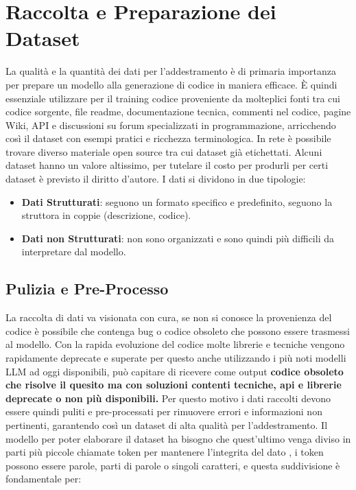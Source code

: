 \documentclass[12pt,a4paper,openright,twoside]{book}
\begin{document}
\section{Raccolta e Preparazione dei Dataset}
La qualità e la quantità dei dati per l'addestramento è di primaria importanza per prepare un modello alla generazione di codice in maniera efficace.
È quindi essenziale utilizzare per il training codice proveniente da molteplici fonti tra cui codice sorgente, file readme, documentazione tecnica, commenti nel codice,
pagine Wiki, API e discussioni su forum specializzati in programmazione, arricchendo così il dataset con esempi pratici e ricchezza terminologica.
In rete è possibile trovare diverso materiale open source tra cui dataset già etichettati. Alcuni dataset hanno un valore altissimo,
per tutelare il costo per produrli per certi dataset è previsto il diritto d'autore.
I dati si dividono in due tipologie:
\begin{itemize}
    \item \textbf{Dati Strutturati}: seguono un formato specifico e predefinito, seguono la struttora in coppie (descrizione, codice).
    \item \textbf{Dati non Strutturati}: non sono organizzati e sono quindi più difficili da interpretare dal modello. 
\end{itemize}
\subsection{Pulizia e Pre-Processo}
La raccolta di dati va visionata con cura, se non si conosce la provenienza del codice è possibile che contenga bug o codice obsoleto che possono essere trasmessi al modello.
Con la rapida evoluzione del codice molte librerie e tecniche vengono rapidamente deprecate e superate per questo anche utilizzando i più noti modelli LLM ad oggi disponibili, può capitare di ricevere come output \textbf{codice obsoleto che risolve il quesito ma con soluzioni contenti tecniche, api e librerie deprecate o non più disponibili.}
Per questo motivo i dati raccolti devono essere quindi puliti e pre-processati per rimuovere errori e informazioni non pertinenti, garantendo così un dataset di alta qualità per l'addestramento.
\newline Il modello per poter elaborare il dataset ha bisogno che quest'ultimo venga diviso in parti più piccole chiamate token per mantenere l'integrita del dato \cite{stanford-codegen},
i token possono essere parole, parti di parole o singoli caratteri, e questa suddivisione è fondamentale per:
\end{document}
